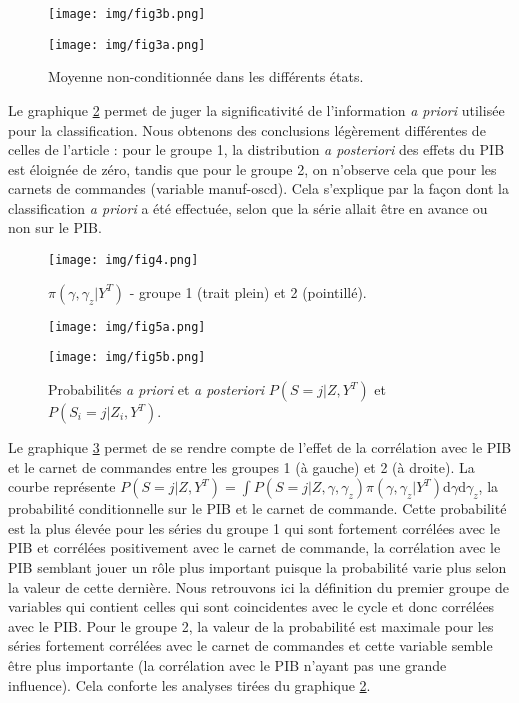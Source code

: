 \documentclass[10pt,french,french]{article}
\begin{document}
\begin{figure}[htb]
\begin{minipage}{.5\textwidth}
\texttt{[image: img/fig3b.png]}
\end{minipage}
\hfill
\begin{minipage}{.5\textwidth}
\texttt{[image: img/fig3a.png]}
\end{minipage}
\caption{Moyenne non-conditionnée dans les différents états.}
\label{etats}
\end{figure}

Le graphique \ref{pi-gamma} permet de juger la significativité de l'information \emph{a priori} utilisée pour la classification.
Nous obtenons des conclusions légèrement différentes de celles de l'article : pour le groupe 1, la distribution \emph{a posteriori} des effets du PIB est éloignée de zéro, tandis que pour le groupe 2, on n'observe cela que pour les carnets de commandes (variable manuf-oscd).
Cela s'explique par la façon dont la classification \emph{a priori} a été effectuée, selon que la série allait être en avance ou non sur le PIB.

\begin{figure}[htb]
\centering
\texttt{[image: img/fig4.png]}
\caption{$\pi(\gamma,\gamma_z|Y^T)$ - groupe 1 (trait plein) et 2 (pointillé).}
\label{pi-gamma}
\end{figure}

\begin{figure}[htb]
\begin{minipage}{.5\textwidth}
\texttt{[image: img/fig5a.png]}
\end{minipage}
\hfill
\begin{minipage}{.5\textwidth}
\texttt{[image: img/fig5b.png]}
\end{minipage}
\caption{Probabilités \textit{a priori} et \textit{a posteriori} $P(S = j|Z,Y^T)$ et $P(S_i = j|Z_i,Y^T)$.}
\label{graph3d}
\end{figure}

Le graphique \ref{graph3d} permet de se rendre compte de l'effet de la corrélation avec le PIB et le carnet de commandes entre les groupes 1 (à gauche) et 2 (à droite).
La courbe représente \(P(S = j|Z,Y^T) = \int P(S=j|Z,\gamma,\gamma_z)\pi(\gamma,\gamma_z|Y^T)\mathrm{d}\gamma\mathrm{d}\gamma_z\), la probabilité conditionnelle sur le PIB et le carnet de commande.
Cette probabilité est la plus élevée pour les séries du groupe 1 qui sont fortement corrélées avec le PIB et corrélées positivement avec le carnet de commande, la corrélation avec le PIB semblant jouer un rôle plus important puisque la probabilité varie plus selon la valeur de cette dernière.
Nous retrouvons ici la définition du premier groupe de variables qui contient celles qui sont coincidentes avec le cycle et donc corrélées avec le PIB.
Pour le groupe 2, la valeur de la probabilité est maximale pour les séries fortement corrélées avec le carnet de commandes et cette variable semble être plus importante (la corrélation avec le PIB n'ayant pas une grande influence).
Cela conforte les analyses tirées du graphique \ref{pi-gamma}.
\end{document}
